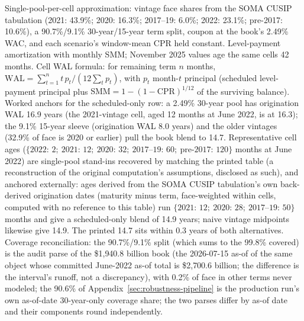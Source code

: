 \documentclass[12pt]{article}
\begin{document}
\begin{table}[H]
\begin{threeparttable}
\begin{tablenotes}[flushleft]
\item Single-pool-per-cell approximation: vintage face shares from the SOMA CUSIP tabulation (2021: 43.9\%; 2020: 16.3\%; 2017--19: 6.0\%; 2022: 23.1\%; pre-2017: 10.6\%), a 90.7\%/9.1\% 30-year/15-year term split, coupon at the book's 2.49\% WAC, and each scenario's window-mean CPR held constant. Level-payment amortization with monthly SMM; November 2025 values age the same cells 42 months. Cell WAL formula: for remaining term $n$ months, $\mathrm{WAL} = \sum_{t=1}^{n} t\, p_t / (12 \sum_{t} p_t)$, with $p_t$ month-$t$ principal (scheduled level-payment principal plus $\mathrm{SMM} = 1-(1-\mathrm{CPR})^{1/12}$ of the surviving balance). Worked anchors for the scheduled-only row: a 2.49\% 30-year pool has origination WAL 16.9 years (the 2021-vintage cell, aged 12 months at June 2022, is at 16.3); the 9.1\% 15-year sleeve (origination WAL 8.0 years) and the older vintages (32.9\% of face is 2020 or earlier) pull the book blend to 14.7. Representative cell ages ($\{2022{:}\,2;\ 2021{:}\,12;\ 2020{:}\,32;\ 2017\text{--}19{:}\,60;\ \text{pre-}2017{:}\,120\}$ months at June 2022) are single-pool stand-ins recovered by matching the printed table (a reconstruction of the original computation's assumptions, disclosed as such), and anchored externally: ages derived from the SOMA CUSIP tabulation's own back-derived origination dates (maturity minus term, face-weighted within cells, computed with no reference to this table) run $\{2021{:}\,12;\ 2020{:}\,28;\ 2017\text{--}19{:}\,50\}$ months and give a scheduled-only blend of 14.9 years; naive vintage midpoints likewise give 14.9. The printed 14.7 sits within 0.3 years of both alternatives. Coverage reconciliation: the 90.7\%/9.1\% split (which sums to the 99.8\% covered) is the audit parse of the \$1{,}940.8 billion book (the 2026-07-15 as-of of the same object whose committed June-2022 as-of total is \$2{,}700.6 billion; the difference is the interval's runoff, not a discrepancy), with 0.2\% of face in other terms never modeled; the 90.6\% of Appendix~\ref{sec:robustness-pipeline} is the production run's own as-of-date 30-year-only coverage share; the two parses differ by as-of date and their components round independently.

\end{tablenotes}
\end{threeparttable}
\end{table}
\end{document}
